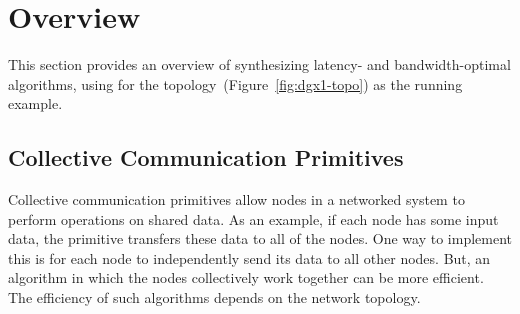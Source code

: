 \section{Overview}
This section provides an overview of synthesizing latency- and bandwidth-optimal algorithms, using \allgather for the
\dgxone topology~(Figure~\ref{fig:dgx1-topo}) as the running example.

\subsection{Collective Communication Primitives}
\label{sec:background-collectives}
Collective communication primitives allow nodes in a networked system to perform operations on shared data. As an example, if each node has some input data, the \allgather primitive transfers these data to all of the nodes.  One way to implement this is for each node to independently send its data to all other nodes. But, an algorithm in which the nodes collectively work together can be more efficient. The efficiency of such algorithms depends on the network topology.

